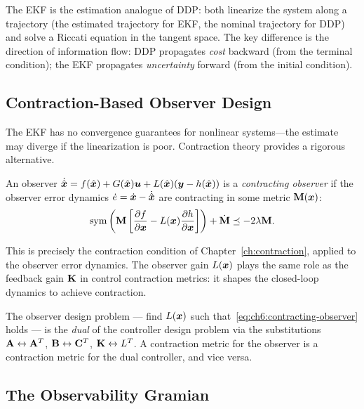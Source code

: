 \begin{intuitionbox}
The EKF is the estimation analogue of DDP: both linearize the system along a trajectory
(the estimated trajectory for EKF, the nominal trajectory for DDP) and solve a Riccati
equation in the tangent space. The key difference is the direction of information flow:
DDP propagates \emph{cost} backward (from the terminal condition); the EKF propagates
\emph{uncertainty} forward (from the initial condition).
\end{intuitionbox}

\subsection{Contraction-Based Observer Design}

The EKF has no convergence guarantees for nonlinear systems---the estimate may diverge
if the linearization is poor. Contraction theory provides a rigorous alternative.

An observer $\dot{\hat{\bm{x}}} = f(\hat{\bm{x}}) + G(\hat{\bm{x}})\bm{u} + L(\hat{\bm{x}})(\bm{y} - h(\hat{\bm{x}}))$
is a \emph{contracting observer} if the observer error dynamics
$\dot{e} = \dot{\bm{x}} - \dot{\hat{\bm{x}}}$ are contracting in some metric $\mathbf{M}(\bm{x})$:
\begin{equation}
\operatorname{sym}\left(\mathbf{M} \left[\frac{\partial f}{\partial \bm{x}} - L(\bm{x})\frac{\partial h}{\partial \bm{x}}\right]\right)
+ \dot{\mathbf{M}} \preceq -2\lambda \mathbf{M}.
\label{eq:ch6:contracting-observer}
\end{equation}

This is precisely the contraction condition of Chapter~\ref{ch:contraction}, applied to
the observer error dynamics. The observer gain $L(\bm{x})$ plays the same role as the
feedback gain $\mathbf{K}$ in control contraction metrics: it shapes the closed-loop
dynamics to achieve contraction.

\begin{theorem}
\label{thm:ch6:observer-duality}
The observer design problem --- find $L(\bm{x})$ such that~\eqref{eq:ch6:contracting-observer}
holds --- is the \emph{dual} of the controller design problem via the substitutions
$\mathbf{A} \leftrightarrow \mathbf{A}^T$, $\mathbf{B} \leftrightarrow \mathbf{C}^T$,
$\mathbf{K} \leftrightarrow L^T$. A contraction metric for the observer is a contraction
metric for the dual controller, and vice versa.
\end{theorem}

\subsection{The Observability Gramian}

